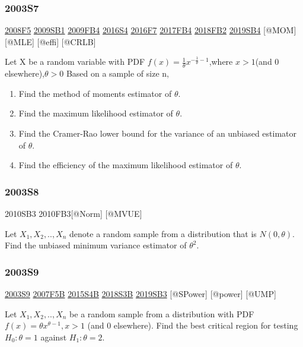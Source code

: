 \documentclass[6pt,twocolumn,Portrait]{article}
\begin{document}
\hypertarget{s7}{%
\subsubsection{2003S7}\label{s7}}

\protect\hyperlink{f5-3}{2008F5} \protect\hyperlink{sb1}{2009SB1}
\protect\hyperlink{fb4}{2009FB4} \protect\hyperlink{s4-4}{2016S4}
\protect\hyperlink{f7-5}{2016F7} \protect\hyperlink{fb4-3}{2017FB4}
\protect\hyperlink{fb2-4}{2018FB2} \protect\hyperlink{sb4-2}{2019SB4}
{[}@MOM{]} {[}@MLE{]} {[}@effi{]} {[}@CRLB{]}

Let X be a random variable with PDF
\(f(x)=\frac1\theta x^{-\frac1\theta-1}\),where \(x>1\)(and 0
elsewhere),\(\theta>0\) Based on a sample of size n,

\begin{enumerate}
\def\labelenumi{\Alph{enumi})}
\item
  Find the method of moments estimator of \(\theta\).
\item
  Find the maximum likelihood estimator of \(\theta\).
\item
  Find the Cramer-Rao lower bound for the variance of an unbiased
  estimator of \(\theta\).
\item
  Find the efficiency of the maximum likelihood estimator of \(\theta\).
\end{enumerate}

\hypertarget{s8}{%
\subsubsection{2003S8}\label{s8}}

2010SB3 2010FB3{[}@Norm{]} {[}@MVUE{]}

Let \(X_1,X_2,..,X_n\) denote a random sample from a distribution that
is \(N(0,\theta)\). Find the unbiased minimum variance estimator of
\(\theta^2\).

\hypertarget{s9}{%
\subsubsection{2003S9}\label{s9}}

\protect\hyperlink{s9}{2003S9} \protect\hyperlink{f5b}{2007F5B}
\protect\hyperlink{s4b-1}{2015S4B} \protect\hyperlink{s3b-2}{2018S3B}
\protect\hyperlink{sb3-3}{2019SB3} {[}@SPower{]} {[}@power{]} {[}@UMP{]}

Let \(X_1,X_2,..,X_n\) be a random sample from a distribution with PDF
\(f(x)=\theta x^{\theta-1}, x>1\) (and 0 elsewhere). Find the best
critical region for testing \(H_0:\theta=1\) against \(H_1:\theta=2\).
\end{document}

